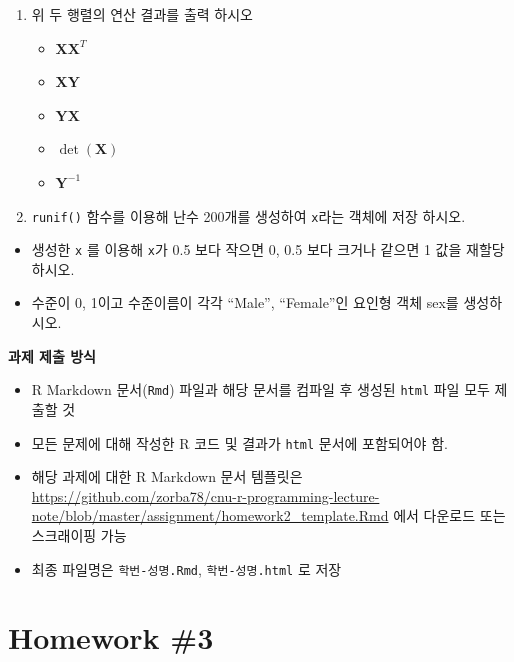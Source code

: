 \documentclass[
  11pt,
]{krantz}
\providecommand{\tightlist}{%
  \setlength{\itemsep}{0pt}\setlength{\parskip}{0pt}}
\let\BeginKnitrBlock\begin \let\EndKnitrBlock\end
\begin{document}
\begin{enumerate}
\def\labelenumi{\arabic{enumi}.}
\setcounter{enumi}{8}
\item
  위 두 행렬의 연산 결과를 출력 하시오

  \begin{itemize}
  \tightlist
  \item
    \(\mathrm{\mathbf{X}}\mathrm{\mathbf{X}}^T\)
  \item
    \(\mathrm{\mathbf{X}}\mathrm{\mathbf{Y}}\)
  \item
    \(\mathrm{\mathbf{Y}}\mathrm{\mathbf{X}}\)
  \item
    \(\det(\mathrm{\mathbf{X}})\)
  \item
    \(\mathrm{\mathbf{Y}}^{-1}\)
  \end{itemize}
\item
  \texttt{runif()} 함수를 이용해 난수 200개를 생성하여 \texttt{x}라는 객체에 저장 하시오.
\end{enumerate}

\begin{itemize}
\tightlist
\item
  생성한 \texttt{x} 를 이용해 \texttt{x}가 0.5 보다 작으면 0, 0.5 보다 크거나 같으면 1 값을 재할당 하시오.
\item
  수준이 0, 1이고 수준이름이 각각 ``Male'', ``Female''인 요인형 객체 sex를 생성하시오.
\end{itemize}

\footnotesize

\BeginKnitrBlock{rmdimportant}
\textbf{과제 제출 방식}

\begin{itemize}
\tightlist
\item
  R Markdown 문서(\texttt{Rmd}) 파일과 해당 문서를 컴파일 후 생성된 \texttt{html} 파일 모두 제출할 것
\item
  모든 문제에 대해 작성한 R 코드 및 결과가 \texttt{html} 문서에 포함되어야 함.
\item
  해당 과제에 대한 R Markdown 문서 템플릿은 \url{https://github.com/zorba78/cnu-r-programming-lecture-note/blob/master/assignment/homework2_template.Rmd} 에서 다운로드 또는 스크래이핑 가능
\item
  최종 파일명은 \texttt{학번-성명.Rmd}, \texttt{학번-성명.html} 로 저장
\end{itemize}
\EndKnitrBlock{rmdimportant}

\normalsize

\hypertarget{homework-3}{%
\section{Homework \#3}\label{homework-3}}
\end{document}
